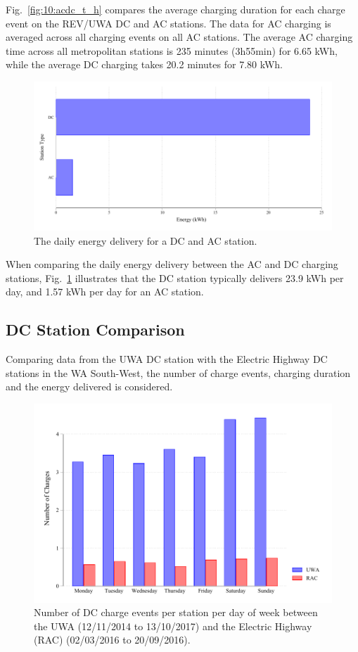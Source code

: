 Fig.~\ref{fig:10:acdc_t_h} compares the average charging duration for each charge event on the REV/UWA DC and AC stations. The data for AC charging is averaged across all charging events on all AC stations. The average AC charging time across all metropolitan stations is 235 minutes (3h55min) for 6.65 kWh, while the average DC charging takes 20.2 minutes for 7.80 kWh.

\begin{figure}[H]
	\centering
	\includegraphics[width=0.8\linewidth]{acdc_t_e}
	\caption{The daily energy delivery for a DC and AC station.}
	\label{fig:10:acdc_t_e}
\end{figure}

When comparing the daily energy delivery between the AC and DC charging stations, Fig.~\ref{fig:10:acdc_t_e} illustrates that the DC station typically delivers 23.9 kWh per day, and 1.57 kWh per day for an AC station.

\subsection{DC Station Comparison}
\label{sec:10:dc}
Comparing data from the UWA DC station with the Electric Highway DC stations in the WA South-West, the number of charge events, charging duration and the energy delivered is considered.

\begin{figure}[H]
	\centering
	\includegraphics[width=0.8\linewidth]{uwarac_c}
	\caption[Number of DC charge events per station per day of week]{Number of DC charge events per station per day of week between the UWA (12/11/2014 to 13/10/2017) and the Electric Highway (RAC) (02/03/2016 to 20/09/2016).}
	\label{fig:10:uwarac_c}
\end{figure}

